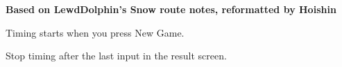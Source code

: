 \documentclass[a4paper, fontsize=11pt, DIV=26, parskip=full]{scrartcl}
\begin{document}
	\textbf{\Large Based on LewdDolphin's Snow route notes, reformatted by Hoishin}

	Timing starts when you press New Game.

	\hrulefill
	
	\hrulefill
	
	\hrulefill
	
	\hrulefill
	
	\hrulefill
	
	\hrulefill
	
	\hrulefill
	
	\hrulefill
	
	\hrulefill
	
	\hrulefill
	
	\hrulefill
	
	\hrulefill
	
	\hrulefill
	

	Stop timing after the last input in the result screen.
\end{document}

